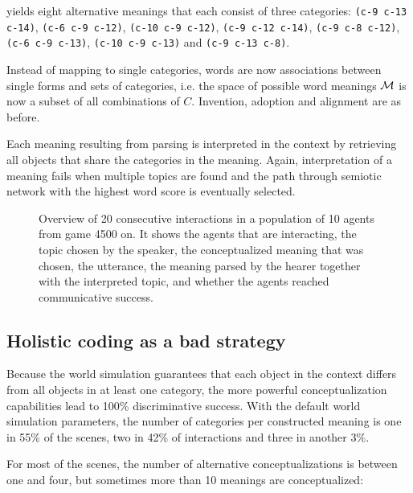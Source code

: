 \noindent yields eight alternative meanings that each consist of three
categories: \texttt{(c-9 c-13 c-14)}, \texttt{(c-6 c-9 c-12)},
\texttt{(c-10 c-9 c-12)}, \texttt{(c-9 c-12 c-14)}, \texttt{(c-9 c-8
  c-12)}, \texttt{(c-6 c-9 c-13)}, \texttt{(c-10 c-9 c-13)} and
\texttt{(c-9 c-13 c-8)}.


 Instead of mapping to single
categories, words are now associations between single forms and sets
of categories, i.e. the space of possible word meanings ${\cal M}$ is
now a subset of all combinations of $C$. Invention, adoption and
alignment are as before.

 Each meaning resulting from parsing is
interpreted in the context by retrieving all objects that share the
categories in the meaning. Again, interpretation of a meaning fails
when multiple topics are found and the path through semiotic network
with the highest word score is eventually selected.

\begin{figure}[t]
  \caption{Overview of 20 consecutive interactions in a population of
    10 agents from game 4500 on. It shows the agents that are
    interacting, the topic chosen by the speaker, the conceptualized
    meaning that was chosen, the utterance, the meaning parsed by the
    hearer together with the interpreted topic, and whether the agents
    reached communicative success.}
  \label{f:sgg-sw-structured-trace}
\end{figure}


\subsection{Holistic coding as a bad strategy}

Because the world simulation guarantees that each object in the
context differs from all objects in at least one category, the more
powerful conceptualization capabilities lead to 100\% discriminative
success. With the default world simulation parameters, the number of
categories per constructed meaning is one in 55\% of the scenes, two
in 42\% of interactions and three in another 3\%.

For most of the scenes, the number of alternative conceptualizations
is between one and four, but sometimes more than 10 meanings are
conceptualized:\\


